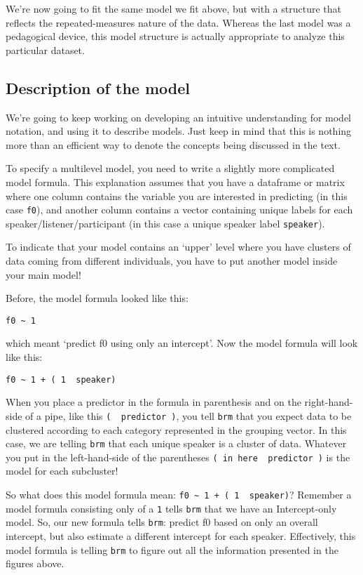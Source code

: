 \documentclass[
]{book}
\begin{document}
We're now going to fit the same model we fit above, but with a structure that reflects the repeated-measures nature of the data. Whereas the last model was a pedagogical device, this model structure is actually appropriate to analyze this particular dataset.

\hypertarget{description-of-the-model-1}{%
\subsection{Description of the model}\label{description-of-the-model-1}}

We're going to keep working on developing an intuitive understanding for model notation, and using it to describe models. Just keep in mind that this is nothing more than an efficient way to denote the concepts being discussed in the text.

To specify a multilevel model, you need to write a slightly more complicated model formula. This explanation assumes that you have a dataframe or matrix where one column contains the variable you are interested in predicting (in this case \texttt{f0}), and another column contains a vector containing unique labels for each speaker/listener/participant (in this case a unique speaker label \texttt{speaker}).

To indicate that your model contains an `upper' level where you have clusters of data coming from different individuals, you have to put another model inside your main model!

Before, the model formula looked like this:

\texttt{f0\ \textasciitilde{}\ 1}

which meant `predict f0 using only an intercept'. Now the model formula will look like this:

\texttt{f0\ \textasciitilde{}\ 1\ +\ (\ 1\ \textbar{}\ speaker)}

When you place a predictor in the formula in parenthesis and on the right-hand-side of a pipe, like this \texttt{(\ \textbar{}\ predictor\ )}, you tell \texttt{brm} that you expect data to be clustered according to each category represented in the grouping vector. In this case, we are telling \texttt{brm} that each unique speaker is a cluster of data. Whatever you put in the left-hand-side of the parentheses \texttt{(\ in\ here\ \textbar{}\ predictor\ )} is the model for each subcluster!

So what does this model formula mean: \texttt{f0\ \textasciitilde{}\ 1\ +\ (\ 1\ \textbar{}\ speaker)}? Remember a model formula consisting only of a \texttt{1} tells \texttt{brm} that we have an Intercept-only model. So, our new formula tells \texttt{brm}: predict f0 based on only an overall intercept, but also estimate a different intercept for each speaker. Effectively, this model formula is telling \texttt{brm} to figure out all the information presented in the figures above.
\end{document}
